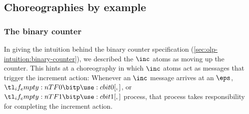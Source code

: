 


% 

% 

\subsection{Choreographies by example}\label{sec:chor-by-example}

\subsubsection{The binary counter}\label{sec:chor-example-counter}

In giving the intuition behind the binary counter specification (\cref{sec:olp-intuition:binary-counter}), we described the $\inc$ atoms %
as moving up the counter.
This hints at a choreography in which $\inc$ atoms act as messages that trigger the increment action:
Whenever an $\inc$ message arrives at an $\eps$, $\bit{0}$, or $\bit{1}$ process, that process takes responsibility for completing the increment action.


